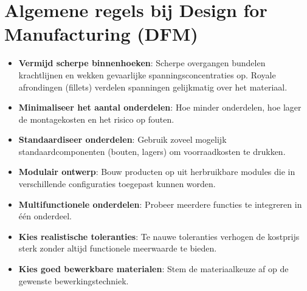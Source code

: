 \documentclass[a4paper,11pt,twoside]{report}
\begin{document}
\section{Algemene regels bij Design for Manufacturing (DFM)}
\begin{itemize}
    \item \textbf{Vermijd scherpe binnenhoeken}: Scherpe overgangen bundelen krachtlijnen en wekken gevaarlijke spanningsconcentraties op. Royale afrondingen (fillets) verdelen spanningen gelijkmatig over het materiaal.
    \item \textbf{Minimaliseer het aantal onderdelen}: Hoe minder onderdelen, hoe lager de montagekosten en het risico op fouten.
    \item \textbf{Standaardiseer onderdelen}: Gebruik zoveel mogelijk standaardcomponenten (bouten, lagers) om voorraadkosten te drukken.
    \item \textbf{Modulair ontwerp}: Bouw producten op uit herbruikbare modules die in verschillende configuraties toegepast kunnen worden.
    \item \textbf{Multifunctionele onderdelen}: Probeer meerdere functies te integreren in één onderdeel.
    \item \textbf{Kies realistische toleranties}: Te nauwe toleranties verhogen de kostprijs sterk zonder altijd functionele meerwaarde te bieden.
    \item \textbf{Kies goed bewerkbare materialen}: Stem de materiaalkeuze af op de gewenste bewerkingstechniek.
\end{itemize}
\end{document}
